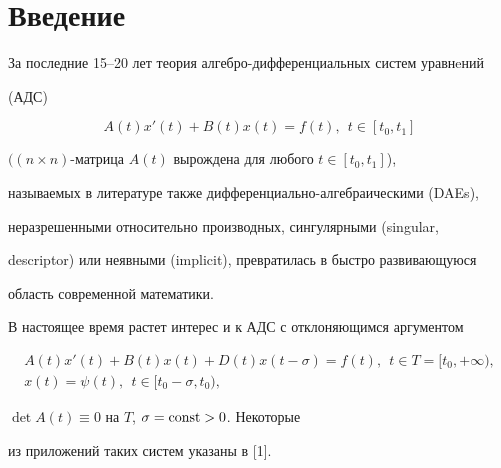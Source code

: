 

\maketitle


\label{begin}











\section*{Введение}





За последние 15--20 лет теория алгебро-дифференциальных систем уравнeний


(АДС)


\begin{equation}


A(t)x'(t)+B(t)x(t)=f(t), \ \ t\in [t_0,t_1]


\end{equation}


$((n \times n)$-матрица $A(t)$ вырождена для любого $t \in [t_0,t_1]$),


называемых в литературе также дифференциально-алгебраическими (DAEs),


неразрешенными относительно производных, сингулярными (singular,


descriptor) или неявными (implicit), превратилась в быстро развивающуюся


область современной математики.


В настоящее время растет интерес и к АДС с отклоняющимся аргументом


\begin{gather}


A(t)x'(t)+B(t)x(t)+D(t)x(t-\sigma)=f(t), \ \ t\in T=[t_0,+\infty), \\


%


x(t)=\psi (t), \ \ t \in [t_0-\sigma, t_0),


\end{gather}


$\det A(t) \equiv 0$ на $T$, $\sigma=\operatorname{const}>0$. Некоторые


из приложений таких систем указаны в [1].





